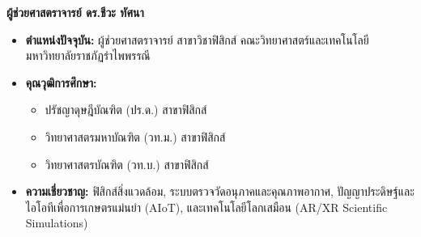 \noindent\textbf{ผู้ช่วยศาสตราจารย์ ดร.ชีวะ ทัศนา}
\begin{itemize}
    \item \textbf{ตำแหน่งปัจจุบัน:} ผู้ช่วยศาสตราจารย์ สาขาวิชาฟิสิกส์ คณะวิทยาศาสตร์และเทคโนโลยี มหาวิทยาลัยราชภัฏรำไพพรรณี
    \item \textbf{คุณวุฒิการศึกษา:}
    \begin{itemize}
        \item ปรัชญาดุษฎีบัณฑิต (ปร.ด.) สาขาฟิสิกส์
        \item วิทยาศาสตรมหาบัณฑิต (วท.ม.) สาขาฟิสิกส์
        \item วิทยาศาสตรบัณฑิต (วท.บ.) สาขาฟิสิกส์
    \end{itemize}
    \item \textbf{ความเชี่ยวชาญ:} ฟิสิกส์สิ่งแวดล้อม, ระบบตรวจวัดอนุภาคและคุณภาพอากาศ, ปัญญาประดิษฐ์และไอโอทีเพื่อการเกษตรแม่นยำ (AIoT), และเทคโนโลยีโลกเสมือน (AR/XR Scientific Simulations)
\end{itemize}
